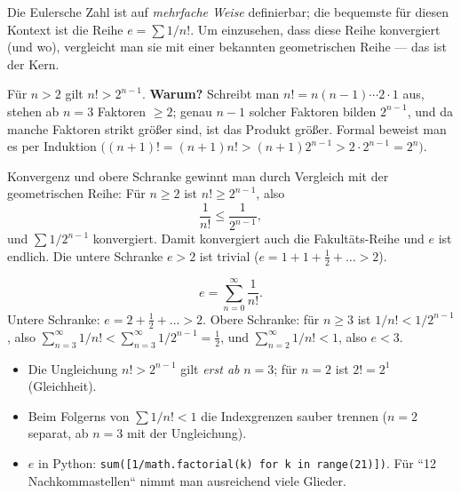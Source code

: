 


Die Eulersche Zahl ist auf \emph{mehrfache Weise} definierbar; die
bequemste f\"ur diesen Kontext ist die Reihe
$e=\sum 1/n!$. Um einzusehen, dass diese Reihe konvergiert (und wo), 
vergleicht man sie mit einer bekannten geometrischen Reihe --- das ist 
der Kern.

\begin{werkzeugkasten}[$n!$ gegen $2^{n-1}$]
F\"ur $n>2$ gilt $n!>2^{n-1}$. \textbf{Warum?} Schreibt man
$n!=n(n-1)\cdots2\cdot1$ aus, stehen ab $n=3$ Faktoren $\ge2$; genau
$n-1$ solcher Faktoren bilden $2^{n-1}$, und da manche Faktoren strikt
gr\"o\ss{}er sind, ist das Produkt gr\"o\ss{}er. Formal beweist man es per
Induktion $\bigl((n+1)!=(n+1)n!>(n+1)2^{n-1}>2\cdot2^{n-1}=2^n\bigr)$.
\end{werkzeugkasten}

\begin{werkzeugkasten}
Konvergenz und obere Schranke gewinnt man durch Vergleich mit der
geometrischen Reihe: F\"ur $n\ge2$ ist $n!\ge2^{n-1}$, also
\begin{equation}
  \frac1{n!}\le\frac1{2^{n-1}},
\end{equation}
und $\sum 1/2^{n-1}$ konvergiert. Damit konvergiert auch die
Fakult\"ats-Reihe und $e$ ist endlich. Die untere Schranke $e>2$ ist
trivial ($e=1+1+\tfrac12+\dots>2$).
\end{werkzeugkasten}

\begin{werkzeugkasten}
\begin{equation}
  e=\sum_{n=0}^{\infty}\frac1{n!}.
\end{equation}
Untere Schranke: $e=2+\frac12+\dots>2$. Obere Schranke: f\"ur $n\ge3$
ist $1/n!<1/2^{n-1}$, also
$\sum_{n=3}^\infty 1/n!<\sum_{n=3}^\infty 1/2^{n-1}=\frac12$, und
$\sum_{n=2}^\infty 1/n!<1$, also $e<3$.
\end{werkzeugkasten}

\begin{achtung}
\begin{itemize}
  \item Die Ungleichung $n!>2^{n-1}$ gilt \emph{erst ab} $n=3$; f\"ur
        $n=2$ ist $2!=2^{1}$ (Gleichheit).
  \item Beim Folgerns von $\sum 1/n!<1$ die Indexgrenzen sauber trennen
        ($n=2$ separat, ab $n=3$ mit der Ungleichung).
  \item $e$ in Python: \texttt{sum([1/math.factorial(k) for k in range(21)])}.
        F\"ur ``12 Nachkommastellen`` nimmt man ausreichend viele Glieder.
\end{itemize}
\end{achtung}
